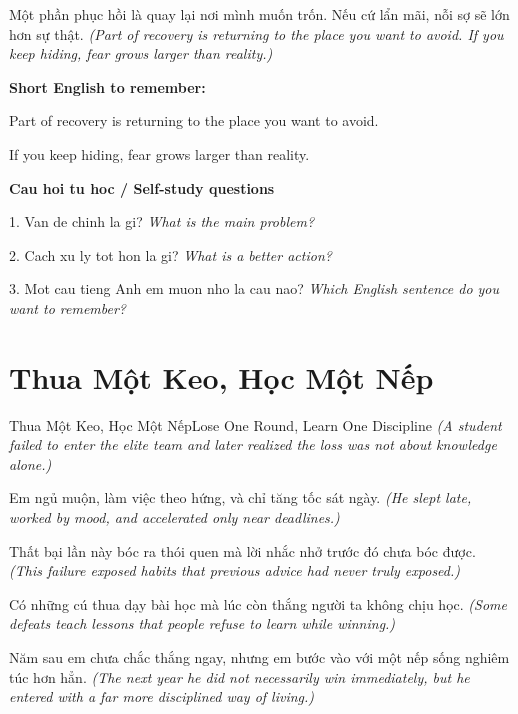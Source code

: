 \begin{baihoc}
Một phần phục hồi là quay lại nơi mình muốn trốn. Nếu cứ lẩn mãi, nỗi sợ sẽ lớn hơn sự thật.
\textit{(Part of recovery is returning to the place you want to avoid. If you keep hiding, fear grows larger than reality.)}
\end{baihoc}

\begin{ghinhoanh}
\textbf{Short English to remember:}

Part of recovery is returning to the place you want to avoid.

If you keep hiding, fear grows larger than reality.

\end{ghinhoanh}

\begin{tuhocnhanh}
\textbf{Cau hoi tu hoc / Self-study questions}

1. Van de chinh la gi? \textit{What is the main problem?}

2. Cach xu ly tot hon la gi? \textit{What is a better action?}

3. Mot cau tieng Anh em muon nho la cau nao? \textit{Which English sentence do you want to remember?}
\end{tuhocnhanh}
\ngancach

\section{Thua Một Keo, Học Một Nếp}
\begin{truyen}{Thua Một Keo, Học Một Nếp}{Lose One Round, Learn One Discipline}
\textit{(A student failed to enter the elite team and later realized the loss was not about knowledge alone.)}

Em ngủ muộn, làm việc theo hứng, và chỉ tăng tốc sát ngày.
\textit{(He slept late, worked by mood, and accelerated only near deadlines.)}

Thất bại lần này bóc ra thói quen mà lời nhắc nhở trước đó chưa bóc được.
\textit{(This failure exposed habits that previous advice had never truly exposed.)}

Có những cú thua dạy bài học mà lúc còn thắng người ta không chịu học.
\textit{(Some defeats teach lessons that people refuse to learn while winning.)}

Năm sau em chưa chắc thắng ngay, nhưng em bước vào với một nếp sống nghiêm túc hơn hẳn.
\textit{(The next year he did not necessarily win immediately, but he entered with a far more disciplined way of living.)}

\end{truyen}


